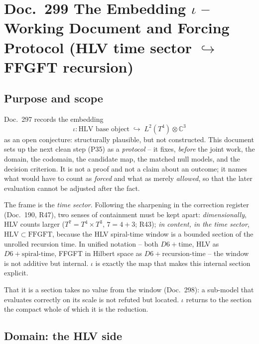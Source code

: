 
\section*{Doc.~299 \quad The Embedding $\iota$ -- Working Document and
Forcing Protocol (HLV time sector $\hookrightarrow$ FFGFT recursion)}

\subsection*{Purpose and scope}

Doc.~297 records the embedding
\begin{equation}
  \iota\colon \text{HLV base object} \;\hookrightarrow\;
  L^2(T^4)\otimes\mathbb{C}^3
\end{equation}
as an open conjecture: structurally plausible, but not constructed. This
document sets up the next clean step (P35) as a \emph{protocol} -- it fixes,
\emph{before} the joint work, the domain, the codomain, the candidate map, the
matched null models, and the decision criterion. It is not a proof and not a
claim about an outcome; it names what would have to count as \emph{forced} and
what as merely \emph{allowed}, so that the later evaluation cannot be adjusted
after the fact.

The frame is the \emph{time sector}. Following the sharpening in the
correction register (Doc.~190, R47), two senses of containment must be kept
apart: \emph{dimensionally}, HLV counts larger ($T^7 = T^4\times T^3$,
$7 = 4+3$; R43); \emph{in content, in the time sector},
$\mathrm{HLV}\subset\mathrm{FFGFT}$, because the HLV spiral-time window is a
bounded section of the unrolled recursion time. In unified notation -- both
$D6 + \text{time}$, HLV as $D6 + \text{spiral-time}$, FFGFT in Hilbert space as
$D6 + \text{recursion-time}$ -- the window is not additive but internal.
$\iota$ is exactly the map that makes this internal section explicit.

That it is a section takes no value from the window (Doc.~298): a sub-model
that evaluates correctly on its scale is not refuted but located. $\iota$
returns to the section the compact whole of which it is the reduction.

\subsection*{Domain: the HLV side}

